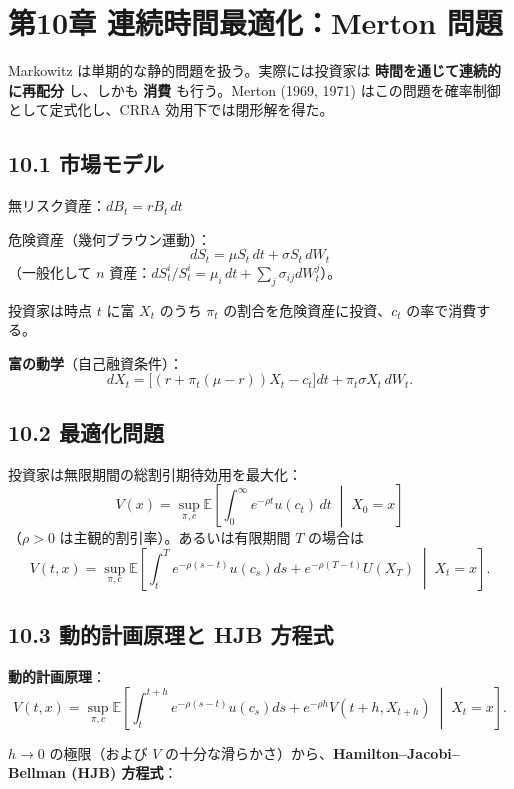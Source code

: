 \documentclass[11pt,a4paper]{report}
\begin{document}
\noindent\hrulefill

\chapter{第10章 連続時間最適化：Merton 問題}

Markowitz は単期的な静的問題を扱う。実際には投資家は \textbf{時間を通じて連続的に再配分} し、しかも \textbf{消費} も行う。Merton (1969, 1971) はこの問題を確率制御として定式化し、CRRA 効用下では閉形解を得た。

\section{10.1 市場モデル}

無リスク資産：$dB_t = r B_t \, dt$

危険資産（幾何ブラウン運動）： \[ dS_t = \mu S_t \, dt + \sigma S_t \, dW_t \] （一般化して $n$ 資産：$dS_t^i / S_t^i = \mu_i \, dt + \sum_j \sigma_{ij} dW_t^j$）。

投資家は時点 $t$ に富 $X_t$ のうち $\pi_t$ の割合を危険資産に投資、$c_t$ の率で消費する。

\textbf{富の動学}（自己融資条件）： \[ dX_t = \bigl[(r + \pi_t (\mu - r)) X_t - c_t\bigr] dt + \pi_t \sigma X_t \, dW_t. \]

\section{10.2 最適化問題}

投資家は無限期間の総割引期待効用を最大化： \[ V(x) = \sup_{\pi, c} \mathbb{E}\left[\int_0^\infty e^{-\rho t} u(c_t) \, dt \;\middle|\; X_0 = x\right] \] （$\rho > 0$ は主観的割引率）。あるいは有限期間 $T$ の場合は \[ V(t, x) = \sup_{\pi, c}\mathbb{E}\left[\int_t^T e^{-\rho(s-t)} u(c_s) ds + e^{-\rho(T-t)} U(X_T)\;\middle|\; X_t = x\right]. \]

\section{10.3 動的計画原理と HJB 方程式}

\textbf{動的計画原理}： \[ V(t, x) = \sup_{\pi, c} \mathbb{E}\left[\int_t^{t+h} e^{-\rho(s-t)} u(c_s) ds + e^{-\rho h} V(t+h, X_{t+h})\;\middle|\; X_t = x\right]. \]

$h \to 0$ の極限（および $V$ の十分な滑らかさ）から、\textbf{Hamilton–Jacobi–Bellman (HJB) 方程式}：
\end{document}
